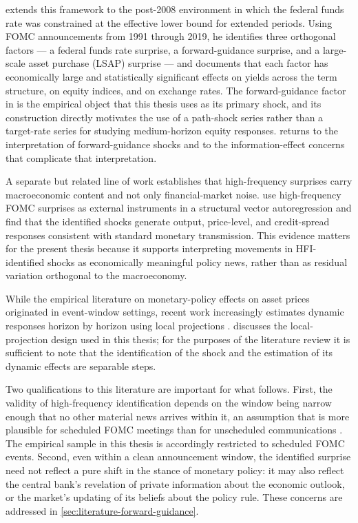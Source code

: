 \citet{swanson2021} extends this framework to the post-2008 environment
in which the federal funds rate was constrained at the effective lower
bound for extended periods. Using FOMC announcements from 1991 through
2019, he identifies three orthogonal factors --- a federal funds rate
surprise, a forward-guidance surprise, and a large-scale asset purchase
(LSAP) surprise --- and documents that each factor has economically
large and statistically significant effects on yields across the term
structure, on equity indices, and on exchange rates. The forward-guidance
factor in \citet{swanson2021} is the empirical object that this thesis
uses as its primary shock, and its construction directly motivates the
use of a path-shock series rather than a target-rate series for studying
medium-horizon equity responses. 
returns to the interpretation of forward-guidance shocks and to the
information-effect concerns that complicate that interpretation.

A separate but related line of work establishes that high-frequency
surprises carry macroeconomic content and not only financial-market
noise. \citet{gertlerKaradi2015} use high-frequency FOMC surprises as
external instruments in a structural vector autoregression and find
that the identified shocks generate output, price-level, and credit-spread
responses consistent with standard monetary transmission. This evidence
matters for the present thesis because it supports interpreting movements
in HFI-identified shocks as economically meaningful policy news, rather
than as residual variation orthogonal to the macroeconomy.

While the empirical literature on monetary-policy effects on asset
prices originated in event-window settings, recent work increasingly
estimates dynamic responses horizon by horizon using local projections
\citep{jorda2005,jordaTaylor2025}.  discusses
the local-projection design used in this thesis; for the purposes of the
literature review it is sufficient to note that the identification of
the shock and the estimation of its dynamic effects are separable steps.

Two qualifications to this literature are important for what follows.
First, the validity of high-frequency identification depends on the
window being narrow enough that no other material news arrives within
it, an assumption that is more plausible for scheduled FOMC meetings
than for unscheduled communications \citep{gurkaynakSackSwanson2005}.
The empirical sample in this thesis is accordingly restricted to
scheduled FOMC events. Second, even within a clean announcement
window, the identified surprise need not reflect a pure shift in the
stance of monetary policy: it may also reflect the central bank's
revelation of private information about the economic outlook, or the
market's updating of its beliefs about the policy rule. These concerns
are addressed in \cref{sec:literature-forward-guidance}.

